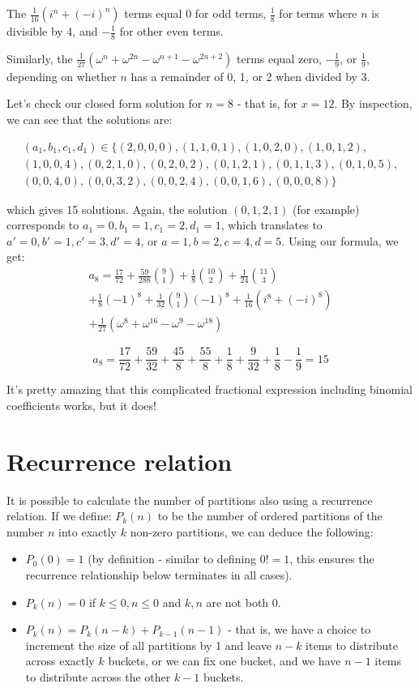 \documentclass{article}
\begin{document}
The $\frac{1}{16}(i^n + (-i)^n)$ terms equal 0 for odd terms, $\frac{1}{8}$ for terms
where $n$ is divisible by 4, and $-\frac{1}{8}$ for other even terms.

Similarly, the $\frac{1}{27}\left(\omega^{n} + \omega^{2n} - \omega^{n+1} - \omega^{2n+2}\right)$
terms equal zero, $-\frac{1}{9}$, or $\frac{1}{9}$, depending on whether $n$ has a remainder of
0, 1, or 2 when divided by 3.

Let’s check our closed form solution for $n=8$ - that is, for $x=12$. By inspection, we can see that the solutions are:

\begin{multline*}
(a_1,b_1,c_1,d_1) \in \{(2,0,0,0), (1,1,0,1), (1,0,2,0), (1,0,1,2),\\
(1,0,0,4), (0,2,1,0), (0,2,0,2), (0,1,2,1),(0,1,1,3), (0,1,0,5),\\
(0,0,4,0), (0,0,3,2), (0,0,2,4), (0,0,1,6), (0,0,0,8)\}
\end{multline*}

which gives 15 solutions. Again, the solution $(0,1,2,1)$ (for example) corresponds to $a_1 = 0, b_1=1, c_1=2, d_1=1$, which translates to $a'=0, b'=1, c'=3, d'=4$, or $a=1, b=2, c=4, d=5$.
Using our formula, we get:
\begin{multline*}
a_8 = \frac{17}{72} + \frac{59}{288}\binom{9}{1} + \frac{1}{8}\binom{10}{2} + \frac{1}{24}\binom{11}{3} \\ + \frac{1}{8}(-1)^8 + \frac{1}{32}\binom{9}{1}(-1)^8 + \frac{1}{16}(i^8 + (-i)^8) \\ + \frac{1}{27}\left(\omega^{8} + \omega^{16} - \omega^{9} - \omega^{18}\right)
\end{multline*}

\[a_8 = \frac{17}{72} + \frac{59}{32} + \frac{45}{8} + \frac{55}{8} + \frac{1}{8} + \frac{9}{32} + \frac{1}{8} - \frac{1}{9} = 15 \]

It’s pretty amazing that this complicated fractional expression including binomial coefficients works, but it does!

\section{Recurrence relation}

It is possible to calculate the number of partitions also using a recurrence relation. If we define:
$P_k(n)$ to be the number of ordered partitions of the number $n$ into exactly $k$ non-zero partitions, we can deduce the following:
\begin{itemize}
    \item $P_0(0) = 1$ (by definition - similar to defining $0! = 1$, this ensures the recurrence relationship below terminates in all cases).
    \item $P_k(n) = 0$ if $k\leq 0, n\leq 0$ and $k,n$ are not both $0$.
    \item $P_k(n) = P_k(n-k) + P_{k-1}(n-1)$ - that is, we have a choice to increment the size of all partitions by 1 and leave $n-k$ items to distribute across exactly $k$ buckets, or we can fix one bucket, and we have $n-1$ items to distribute across the other $k-1$ buckets.
\end{itemize}
\end{document}
